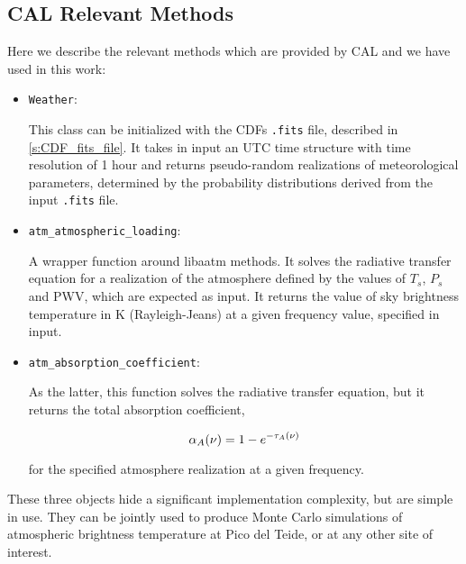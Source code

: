 \subsection{CAL Relevant Methods}

Here we describe the relevant methods which are provided by CAL and we have
used in this work:

\begin{itemize}
        \item \texttt{Weather}:

        This class can be initialized with the CDFs \texttt{.fits} file,
        described in \autoref{s:CDF_fits_file}. It takes in input
        an UTC time structure with time resolution of \num{1} hour and
        returns pseudo-random realizations of meteorological parameters,
        determined by the probability distributions derived from the input
        \texttt{.fits} file.

        \item \texttt{atm\_atmospheric\_loading}:

        A wrapper function around libaatm methods. It solves the radiative
        transfer equation for a realization of the atmosphere defined by
        the values of $T_s$,
        $P_s$ and PWV, which are expected as input. It returns the value of sky
        brightness temperature in \si{\kelvin} (Rayleigh-Jeans) at a given
        frequency value, specified in input.

        \item \texttt{atm\_absorption\_coefficient}:

        As the latter, this function solves the radiative transfer equation,
        but it returns the total absorption coefficient,

        \begin{equation}
                \alpha_A\qty(\nu) = 1 - e^{-\tau_A\qty(\nu)}
        \end{equation}

        for the specified atmosphere realization at a given frequency.
\end{itemize}

These three objects hide a significant implementation complexity, but are
simple in use. They can be jointly used to produce Monte Carlo simulations of
atmospheric brightness temperature at Pico del Teide, or at any other site
of interest.


